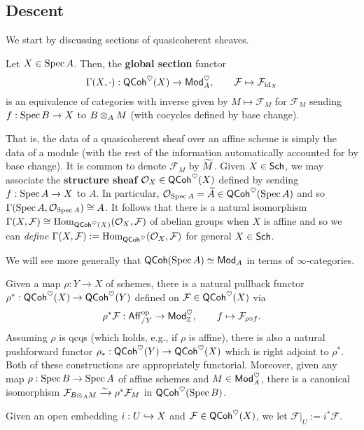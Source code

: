 \documentclass[11pt]{article}
\newcommand{\FF}{\mathcal{F}}
\begin{document}
\subsection{Descent}
We start by discussing sections of quasicoherent sheaves.

\begin{theorem}
Let $X\in\operatorname{Spec} A$. Then, the \textbf{global section} functor 
$$\Gamma(X,\cdot): \QCoh^{\heart}(X)\to\Mod_A^{\heart},\qquad \FF\mapsto\FF_{\id_X}$$
is an equivalence of categories with inverse given by $M\mapsto\FF_M$ for $\FF_M$ sending $f: \operatorname{Spec} B\to X$ to $B\otimes_AM$ (with cocycles defined by base change).
\end{theorem}

That is, the data of a quasicoherent sheaf over an affine scheme is simply the data of a module (with the rest of the information automatically accounted for by base change). It is common to denote $\FF_M$ by $\widetilde{M}$. Given $X\in\operatorname{\mathsf{Sch}}$, we may associate the \textbf{structure sheaf} $\mathcal{O}_X\in\operatorname{\mathsf{QCoh}}^{\heartsuit}(X)$ defined by sending $f: \operatorname{Spec} A\to X$ to $A$. In particular, $\mathcal{O}_{\operatorname{Spec} A}=\widetilde{A}\in\operatorname{\mathsf{QCoh}}^{\heartsuit}(\operatorname{Spec} A)$ and so $\Gamma(\operatorname{Spec} A,\mathcal{O}_{\operatorname{Spec} A})\cong A$. It follows that there is a natural isomorphism $\Gamma(X,\FF)\iso\Hom_{\QCoh^{\heart}(X)}(\O_X,\FF)$ of abelian groups when $X$ is affine and so we can \emph{define} $\Gamma(X,\FF):=\Hom_{\QCoh^{\heart}}(\O_X,\FF)$ for general $X\in\operatorname{\mathsf{Sch}}$.

\begin{remark}
We will see more generally that $\operatorname{\mathsf{QCoh}}(\operatorname{Spec} A)\simeq\operatorname{\mathsf{Mod}}_A$ in terms of $\infty$-categories.
\end{remark}

Given a map $\rho: Y\to X$ of schemes, there is a natural pullback functor $\rho^*: \operatorname{\mathsf{QCoh}}^{\heartsuit}(X)\to\operatorname{\mathsf{QCoh}}^{\heartsuit}(Y)$ defined on $\FF\in\QCoh^{\heart}(X)$ via
$$\rho^*\FF: \Aff_{/Y}^{\op}\to\Mod_{\Z}^{\heart},\qquad f\mapsto\FF_{\rho\circ f}.$$
Assuming $\rho$ is qcqs (which holds, e.g., if $\rho$ is affine), there is also a natural pushforward functor $\rho_*: \operatorname{\mathsf{QCoh}}^{\heartsuit}(Y)\to\operatorname{\mathsf{QCoh}}^{\heartsuit}(X)$ which is right adjoint to $\rho^*$. Both of these constructions are appropriately functorial. Moreover, given any map $\rho: \operatorname{Spec} B\to\operatorname{Spec} A$ of affine schemes and $M\in\operatorname{\mathsf{Mod}}_A^{\heartsuit}$, there is a canonical isomorphism $\FF_{B\tensor_AM}\xto{\sim}\rho^*\FF_M$ in $\operatorname{\mathsf{QCoh}}^{\heartsuit}(\operatorname{Spec} B)$. 

\begin{remark}
Given an open embedding $i: U\hookrightarrow X$ and $\FF\in\QCoh^{\heart}(X)$, we let $\FF|_U:=i^*\FF$.
\end{remark}
\end{document}
